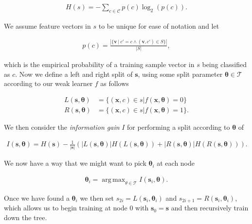 \documentclass[12pt,twoside,notitlepage]{report}
\newcommand{\vc}[1]{\mathbf{#1}}
\newcommand{\cl}[1]{\mathcal{#1}}
\DeclareMathOperator*{\argmax}{arg\,max}
\begin{document}
            \begin{align}
                H(s) = - \sum_{c\in\cl{C}} p(c) \log_2 (p(c)).
                \label{eq:training_seq_entropy}
            \end{align}

            We assume feature vectors in $s$ to be unique for ease of notation and let

            \begin{align}
                p(c) = \frac{\left| \{\vc{v}\ |\ c' = c \land (\vc{v},c') \in S \} \right|}{\left| S \right|},
                \label{eq:empirical_distribution}
            \end{align}
            
            which is the empirical probability of a training sample vector in $s$ being classified as $c$. Now we define 
            a left and right split of $\vc{s}$, using some split parameter $\vc{\theta} \in \cl{T}$ according to our weak 
            learner $f$ as follows

            \begin{align}
                L(\vc{s},\vc{\theta}) & = \{ (\vc{x}, c) \in s | f(\vc{x}, \vc{\theta}) = 0 \}  \label{eq:left_split}\\
                R(\vc{s},\vc{\theta}) & = \{ (\vc{x}, c) \in s | f(\vc{x}, \vc{\theta}) = 1 \}. \label{eq:right_split}
            \end{align}

            We then consider the \textit{information gain} $I$ for performing a split according to $\vc{\theta}$ of 

            \begin{align}
                I(\vc{s}, \vc{\theta}) = H(\vc{s}) - \frac{1}{|\vc{s}|} \left( |L(\vc{s}, \vc{\theta})| H(L(\vc{s}, \vc{\theta})) 
                                                                          + |R(\vc{s}, \vc{\theta})| H(R(\vc{s}, \vc{\theta})) \right).
                \label{eq:information_gain}
            \end{align} 

            We now have a way that we might want to pick $\vc{\theta}_i$ at each node

            \begin{align} 
                \vc{\theta}_i = \argmax_{\theta\in\cl{T}} I(\vc{s}_i, \vc{\theta}).
            \end{align} 

            Once we have found a $\vc{\theta}_i$ we then set $s_{2i} = L(\vc{s}_i, \vc{\theta}_i)$ and 
            $s_{2i+1} = R(\vc{s}_i, \vc{\theta}_i)$, which allows us to begin training at node $0$ with $\vc{s}_0 = \vc{s}$ 
            and then recursively train down the tree. \cite{criminisi2013decision}
\end{document}
